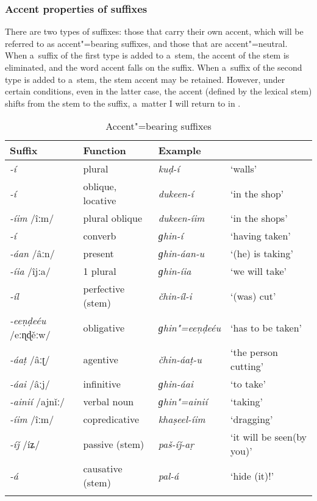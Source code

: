 \subsubsection*{Accent properties of suffixes}

There are two types of suffixes: those that carry their own accent, which will be referred to as
accent"=bearing suffixes, and those that are accent"=neutral. When a~suffix of the first type is added
to a~stem, the accent of the stem is eliminated, and the word accent falls on the suffix. When
a~suffix of the second type is added to a~stem, the stem accent may be retained. However, under
certain conditions, even in the latter case, the accent (defined by the lexical stem) shifts from
the stem to the suffix, a~matter I will return to in .

\begin{table}[ht]
\caption{Accent"=bearing suffixes}
\begin{tabularx}{\textwidth}{ l l l Q }
\lsptoprule
Suffix &
Function &
Example &
\\\hline
\textit{-í} &
plural &
\textit{kuḍ-í} &
`walls'\\
\textit{-í} &
oblique, locative &
\textit{dukeen-í} &
`in the shop'\\
\textit{-íim} /îːm/ &
plural oblique &
\textit{dukeen-íim} &
`in the shops'\\
\textit{-í} &
converb &
\textit{ɡhin-í} &
`having taken'\\
\textit{-áan} /âːn/ &
present &
\textit{ɡhin-áan-u} &
`(he) is taking'\\
\textit{-íia} /îjːa/ &
1 plural &
\textit{ɡhin-íia} &
`we will take'\\
\textit{-íl} &
perfective (stem) &
\textit{čhin-íl-i} &
`(was) cut'\\
\textit{-eeṇḍeéu} /eːɳɖěːw/ &
obligative &
\textit{ɡhin"=eeṇḍeéu} &
`has to be taken'\\
\textit{-áaṭ} /âːʈ/ &
agentive &
\textit{čhin-áaṭ-u} &
`the person cutting'\\
\textit{-áai} /âːj/ &
infinitive &
\textit{ɡhin-áai} &
`to take'\\
\textit{-ainií} /ajnǐː/ &
verbal noun &
\textit{ɡhin"=ainií} &
`taking'\\
\textit{-íim} /îːm/ &
copredicative &
\textit{khaṣeel-íim} &
`dragging'\\
\textit{-íǰ} /íʑ/ &
passive (stem) &
\textit{paš-íǰ-aṛ} &
`it will be seen\newline (by you)'\\
\textit{-á} &
causative (stem) &
\textit{pal-á} &
`hide (it)!'\\\lspbottomrule
\end{tabularx}
\label{tab:3-5}
\end{table}


